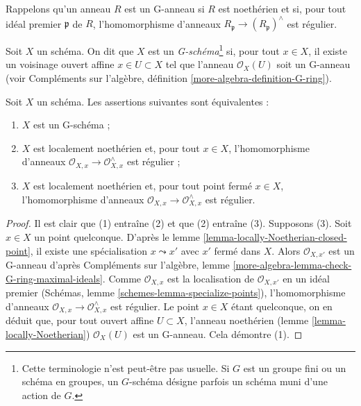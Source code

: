 \noindent
Rappelons qu'un anneau $R$ est un G-anneau si $R$ est noethérien et si,
pour tout idéal premier $\mathfrak p$ de $R$, l'homomorphisme d'anneaux
$R_\mathfrak p \to (R_\mathfrak p)^\wedge$ est régulier.

\begin{definition}
\label{definition-G-scheme}
Soit $X$ un schéma. On dit que $X$ est un {\it G-schéma}\footnote{Cette terminologie
n'est peut-être pas usuelle. Si $G$ est un groupe fini ou un schéma en groupes,
un $G$-schéma désigne parfois un schéma muni d'une
action de $G$.} si, pour tout $x \in X$, il existe un voisinage
ouvert affine $x \in U \subset X$ tel que l'anneau
$\mathcal{O}_X(U)$ soit un G-anneau (voir
Compléments sur l'algèbre, définition \ref{more-algebra-definition-G-ring}).
\end{definition}

\begin{lemma}
\label{lemma-characterize-G-scheme}
Soit $X$ un schéma. Les assertions suivantes sont équivalentes :
\begin{enumerate}
\item $X$ est un G-schéma ;
\item $X$ est localement noethérien et, pour tout $x \in X$, l'homomorphisme
d'anneaux $\mathcal{O}_{X, x} \to \mathcal{O}_{X, x}^\wedge$ est régulier ;
\item $X$ est localement noethérien et, pour tout point fermé $x \in X$,
l'homomorphisme d'anneaux $\mathcal{O}_{X, x} \to \mathcal{O}_{X, x}^\wedge$ est régulier.
\end{enumerate}
\end{lemma}

\begin{proof}
Il est clair que (1) entraîne (2) et que (2) entraîne (3).
Supposons (3). Soit $x \in X$ un point quelconque. D'après le
lemme \ref{lemma-locally-Noetherian-closed-point},
il existe une spécialisation $x \leadsto x'$ avec $x'$ fermé
dans $X$. Alors $\mathcal{O}_{X, x'}$ est un G-anneau d'après
Compléments sur l'algèbre, lemme \ref{more-algebra-lemma-check-G-ring-maximal-ideals}.
Comme $\mathcal{O}_{X, x}$ est la localisation de $\mathcal{O}_{X, x'}$
en un idéal premier (Schémas, lemme \ref{schemes-lemma-specialize-points}),
l'homomorphisme d'anneaux $\mathcal{O}_{X, x} \to \mathcal{O}_{X, x}^\wedge$
est régulier. Le point $x \in X$ étant quelconque, on en déduit
que, pour tout ouvert affine $U \subset X$, l'anneau noethérien
(lemme \ref{lemma-locally-Noetherian}) $\mathcal{O}_X(U)$ est un G-anneau.
Cela démontre (1).
\end{proof}

